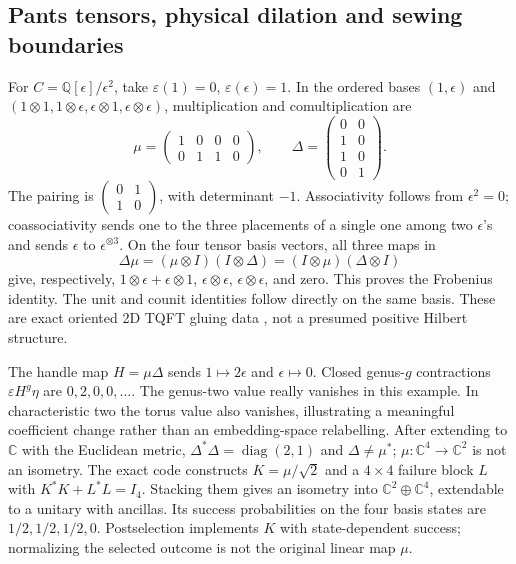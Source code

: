 \documentclass[11pt,oneside,openany]{book}
\theoremstyle{definition}\newtheorem{definition}[theorem]{Definition}
\theoremstyle{remark}\newtheorem{remark}[theorem]{Remark}
\begin{document}
\subsection{Pants tensors, physical dilation and sewing boundaries}
For $C=\mathbb Q[\epsilon]/\epsilon^2$, take
$\varepsilon(1)=0$, $\varepsilon(\epsilon)=1$. In the ordered bases
$(1,\epsilon)$ and $(1\otimes1,1\otimes\epsilon,
\epsilon\otimes1,\epsilon\otimes\epsilon)$, multiplication and
comultiplication are
\[
 \mu=\begin{pmatrix}1&0&0&0\\0&1&1&0\end{pmatrix},\qquad
 \Delta=\begin{pmatrix}0&0\\1&0\\1&0\\0&1\end{pmatrix}.
\]
The pairing is
$\left(\begin{smallmatrix}0&1\\1&0\end{smallmatrix}\right)$,
with determinant $-1$. Associativity follows from $\epsilon^2=0$;
coassociativity sends one to the three placements of a single one among
two $\epsilon$'s and sends $\epsilon$ to $\epsilon^{\otimes3}$.
On the four tensor basis vectors, all three maps in
\[
 \Delta\mu=(\mu\otimes I)(I\otimes\Delta)
          =(I\otimes\mu)(\Delta\otimes I)
\]
give, respectively, $1\otimes\epsilon+\epsilon\otimes1$,
$\epsilon\otimes\epsilon$, $\epsilon\otimes\epsilon$, and zero.
This proves the Frobenius identity. The unit and counit identities follow
directly on the same basis. These are exact oriented 2D TQFT gluing data
\cite{LFAbrams}, not a presumed positive Hilbert structure.

The handle map $H=\mu\Delta$ sends $1\mapsto2\epsilon$ and
$\epsilon\mapsto0$. Closed genus-$g$ contractions
$\varepsilon H^g\eta$ are $0,2,0,0,\ldots$.
The genus-two value really vanishes in this example. In characteristic
two the torus value also vanishes, illustrating a meaningful coefficient
change rather than an embedding-space relabelling.
After extending to $\mathbb C$ with the Euclidean metric,
$\Delta^*\Delta=\operatorname{diag}(2,1)$ and $\Delta\ne\mu^*$;
$\mu:\mathbb C^4\to\mathbb C^2$ is not an isometry.
The exact code constructs $K=\mu/\sqrt2$ and a $4\times4$ failure block
$L$ with $K^*K+L^*L=I_4$. Stacking them gives an isometry into
$\mathbb C^2\oplus\mathbb C^4$, extendable to a unitary with ancillas.
Its success probabilities on the four basis states are
$1/2,1/2,1/2,0$. Postselection implements $K$ with state-dependent success;
normalizing the selected outcome is not the original linear map $\mu$.
\end{document}
